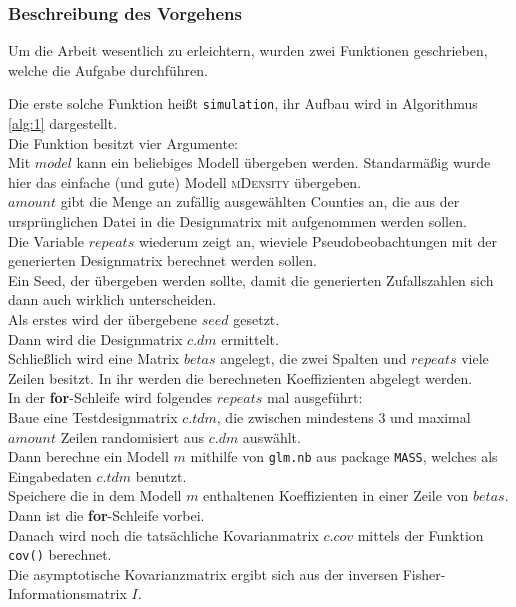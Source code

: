 \subsubsection{Beschreibung des Vorgehens}
Um  die Arbeit wesentlich zu erleichtern, wurden zwei Funktionen geschrieben, welche die Aufgabe durchf\"uhren.
\par\smallskip
Die erste solche Funktion hei\ss{}t \texttt{simulation}, ihr Aufbau wird in Algorithmus \ref{alg:1} dargestellt. \\
Die Funktion besitzt vier Argumente: \\
Mit $model$ kann ein beliebiges Modell \"ubergeben werden. Standarm\"a\ss{}ig wurde hier das einfache (und gute) Modell \textsc{mDensity} \"ubergeben. \\
$amount$ gibt die Menge an zuf\"allig ausgew\"ahlten Counties an, die aus der urspr\"unglichen Datei in die Designmatrix mit aufgenommen werden sollen. \\
Die Variable $repeats$ wiederum zeigt an, wieviele Pseudobeobachtungen mit der generierten Designmatrix berechnet werden sollen. \\
Ein Seed, der \"ubergeben werden sollte, damit die generierten Zufallszahlen sich dann auch wirklich unterscheiden. \\
Als erstes wird der \"ubergebene $seed$ gesetzt. \\
Dann wird die Designmatrix $c.dm$ ermittelt. \\
Schlie\ss{}lich wird eine Matrix $betas$ angelegt, die zwei Spalten und $repeats$ viele Zeilen besitzt.
In ihr werden die berechneten Koeffizienten abgelegt werden. \\
In der \textbf{for}-Schleife wird folgendes $repeats$ mal ausgef\"uhrt: \\
Baue eine Testdesignmatrix $c.tdm$, die zwischen mindestens 3 und maximal $amount$ Zeilen randomisiert aus $c.dm$ ausw\"ahlt. \\
Dann berechne ein Modell $m$ mithilfe von \texttt{glm.nb} aus package \texttt{MASS}, welches als Eingabedaten $c.tdm$ benutzt. \\
Speichere die in dem Modell $m$ enthaltenen Koeffizienten in einer Zeile von $betas$. \\
Dann ist die \textbf{for}-Schleife vorbei. \\
Danach wird noch die tats\"achliche Kovarianmatrix $c.cov$ mittels der Funktion \texttt{cov()} berechnet.\\
Die asymptotische Kovarianzmatrix ergibt sich aus der inversen Fisher-Informationsmatrix $I$. 
